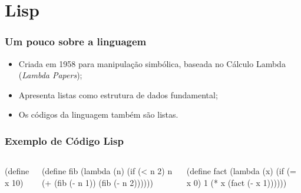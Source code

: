 
\section{Lisp}

\begin{frame}
  \frametitle{Um pouco sobre a linguagem}
  \begin{itemize}
    \item Criada em 1958 para manipulação simbólica, baseada no Cálculo Lambda (\emph{Lambda Papers}); \vspace{1cm}
    \pause
    \item Apresenta listas como estrutura de dados fundamental; \vspace{1cm}
    \pause
    \item Os códigos da linguagem também são listas. \vspace{1cm}
  \end{itemize}
\end{frame}

\begin{frame}[fragile]
  \frametitle{Exemplo de Código Lisp}
  \begin{columns}
    \begin{code}
    (define x 10)
    \end{code}
    \pause
    \begin{code}
    (define fib
      (lambda (n)
        (if (< n 2)
            n
            (+ (fib (- n 1))
               (fib (- n 2))))))
    \end{code}
    \pause
    \begin{code}
(define fact
  (lambda (x)
    (if (= x 0)
        1
        (* x
           (fact (- x 1))))))
    \end{code}
  \end{columns}
\end{frame}

